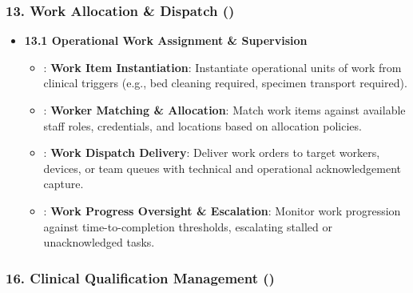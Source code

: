 \subsubsection*{13. Work Allocation \& Dispatch (\texttt{})}
\label{rad:enabling:531}

\begin{itemize}

\item
\textbf{13.1 Operational Work Assignment \& Supervision}


\begin{itemize}

\item
\texttt{}: \textbf{Work Item Instantiation}: Instantiate operational units of work from clinical triggers (e.g., bed cleaning required, specimen transport required).



\item
\texttt{}: \textbf{Worker Matching \& Allocation}: Match work items against available staff roles, credentials, and locations based on allocation policies.



\item
\texttt{}: \textbf{Work Dispatch Delivery}: Deliver work orders to target workers, devices, or team queues with technical and operational acknowledgement capture.



\item
\texttt{}: \textbf{Work Progress Oversight \& Escalation}: Monitor work progression against time-to-completion thresholds, escalating stalled or unacknowledged tasks.



\end{itemize}


\end{itemize}
\label{rad:enabling:537}



\label{rad:enabling:539}
\subsubsection*{16. Clinical Qualification Management (\texttt{})}
\label{rad:enabling:540}

